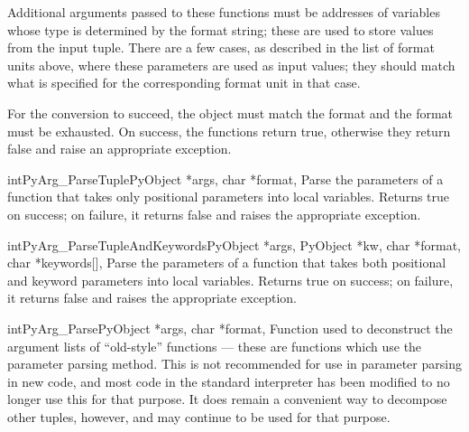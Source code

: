 Additional arguments passed to these functions must be addresses of
variables whose type is determined by the format string; these are
used to store values from the input tuple.  There are a few cases, as
described in the list of format units above, where these parameters
are used as input values; they should match what is specified for the
corresponding format unit in that case.

For the conversion to succeed, the  object must match the
format and the format must be exhausted.  On success, the
 functions return true, otherwise they
return false and raise an appropriate exception.

\begin{cfuncdesc}{int}{PyArg_ParseTuple}{PyObject *args, char *format,
                                         \moreargs}
  Parse the parameters of a function that takes only positional
  parameters into local variables.  Returns true on success; on
  failure, it returns false and raises the appropriate exception.
\end{cfuncdesc}

\begin{cfuncdesc}{int}{PyArg_ParseTupleAndKeywords}{PyObject *args,
                       PyObject *kw, char *format, char *keywords[],
                       \moreargs}
  Parse the parameters of a function that takes both positional and
  keyword parameters into local variables.  Returns true on success;
  on failure, it returns false and raises the appropriate exception.
\end{cfuncdesc}

\begin{cfuncdesc}{int}{PyArg_Parse}{PyObject *args, char *format,
                                    \moreargs}
  Function used to deconstruct the argument lists of ``old-style''
  functions --- these are functions which use the
   parameter parsing method.  This is not
  recommended for use in parameter parsing in new code, and most code
  in the standard interpreter has been modified to no longer use this
  for that purpose.  It does remain a convenient way to decompose
  other tuples, however, and may continue to be used for that
  purpose.
\end{cfuncdesc}

